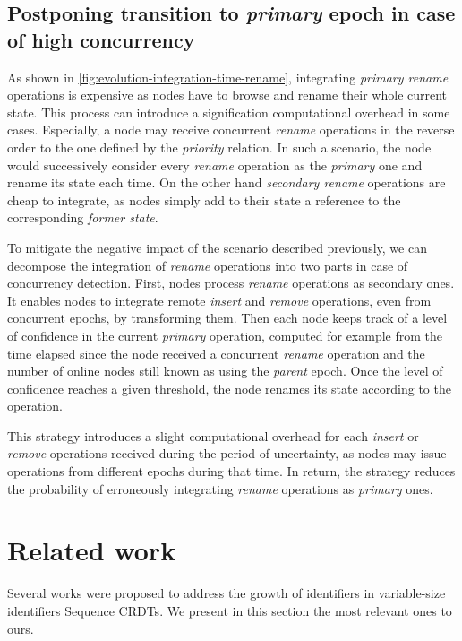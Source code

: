 \documentclass[sigplan,10pt]{acmart}
\begin{document}
\subsection{Postponing transition to \emph{primary} epoch in case of high concurrency}
\label{sec:postponing-transition-to-new-epoch}

As shown in \autoref{fig:evolution-integration-time-rename}, integrating \emph{primary rename} operations is expensive as nodes have to browse and rename their whole current state.
This process can introduce a signification computational overhead in some cases.
Especially, a node may receive concurrent \emph{rename} operations in the reverse order to the one defined by the \emph{priority} relation.
In such a scenario, the node would successively consider every \emph{rename} operation as the \emph{primary} one and rename its state each time.
On the other hand \emph{secondary rename} operations are cheap to integrate, as nodes simply add to their state a reference to the corresponding \emph{former state}.

To mitigate the negative impact of the scenario described previously, we can decompose the integration of \emph{rename} operations into two parts in case of concurrency detection.
First, nodes process \emph{rename} operations as secondary ones.
It enables nodes to integrate remote \emph{insert} and \emph{remove} operations, even from concurrent epochs, by transforming them.
Then each node keeps track of a level of confidence in the current \emph{primary} operation, computed for example from the time elapsed since the node received a concurrent \emph{rename} operation and the number of online nodes still known as using the \emph{parent} epoch.
Once the level of confidence reaches a given threshold, the node renames its state according to the operation.

This strategy introduces a slight computational overhead for each \emph{insert} or \emph{remove} operations received during the period of uncertainty, as nodes may issue operations from different epochs during that time.
In return, the strategy reduces the probability of erroneously integrating \emph{rename} operations as \emph{primary} ones.

\section{Related work}

Several works were proposed to address the growth of identifiers in variable-size identifiers Sequence \acp{CRDT}.
We present in this section the most relevant ones to ours.
\end{document}
